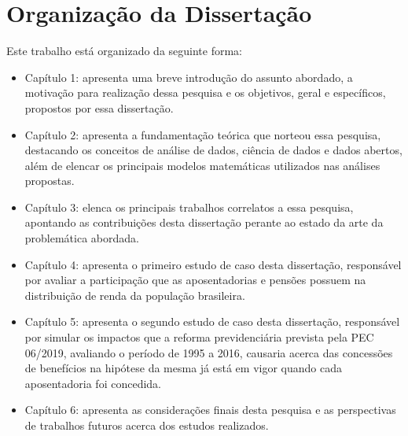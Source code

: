 \section{Organização da Dissertação}

Este trabalho está organizado da seguinte forma:

\begin{itemize}
    \item Capítulo 1: apresenta uma breve introdução do assunto abordado, a motivação para realização dessa pesquisa e os objetivos, geral e específicos, propostos por essa dissertação.
    
    \item Capítulo 2: apresenta a fundamentação teórica que norteou essa pesquisa, destacando os conceitos de análise de dados, ciência de dados e dados abertos, além de elencar os principais modelos matemáticas utilizados nas análises propostas.
    
    \item Capítulo 3: elenca os principais trabalhos correlatos a essa pesquisa, apontando as contribuições desta dissertação perante ao estado da arte da problemática abordada.
    
    \item Capítulo 4: apresenta o primeiro estudo de caso desta dissertação, responsável por avaliar a participação que as aposentadorias e pensões possuem na distribuição de renda da população brasileira.
    
    \item Capítulo 5: apresenta o segundo estudo de caso desta dissertação, responsável por simular os impactos que a reforma previdenciária prevista pela PEC 06/2019, avaliando o período de 1995 a 2016, causaria acerca das concessões de benefícios na hipótese da mesma já está em vigor quando cada aposentadoria foi concedida.
    
    \item Capítulo 6: apresenta as considerações finais desta pesquisa e as perspectivas de trabalhos futuros acerca dos estudos realizados.
\end{itemize}


